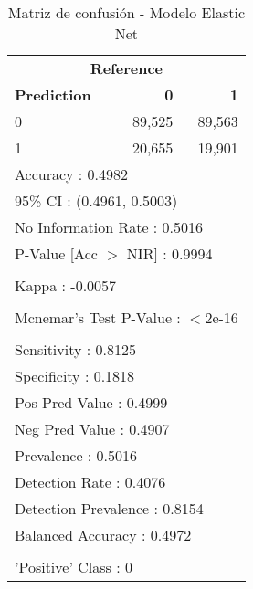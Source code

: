 \begin{table}[htbp]
\centering
\caption{Matriz de confusión - Modelo Elastic Net}
\label{tab:confusion-en}
\begin{tabular}{lrr}
\toprule
\multicolumn{3}{c}{\textbf{Reference}} \\
\textbf{Prediction} & \textbf{0} & \textbf{1} \\
\midrule
0 & 89,525 & 89,563 \\
1 & 20,655 & 19,901 \\
\midrule
\multicolumn{3}{l}{Accuracy : 0.4982} \\
\multicolumn{3}{l}{95\% CI : (0.4961, 0.5003)} \\
\multicolumn{3}{l}{No Information Rate : 0.5016} \\
\multicolumn{3}{l}{P-Value [Acc $>$ NIR] : 0.9994} \\
\\
\multicolumn{3}{l}{Kappa : -0.0057} \\
\\
\multicolumn{3}{l}{Mcnemar's Test P-Value : $<$2e-16} \\
\\
\multicolumn{3}{l}{Sensitivity : 0.8125} \\
\multicolumn{3}{l}{Specificity : 0.1818} \\
\multicolumn{3}{l}{Pos Pred Value : 0.4999} \\
\multicolumn{3}{l}{Neg Pred Value : 0.4907} \\
\multicolumn{3}{l}{Prevalence : 0.5016} \\
\multicolumn{3}{l}{Detection Rate : 0.4076} \\
\multicolumn{3}{l}{Detection Prevalence : 0.8154} \\
\multicolumn{3}{l}{Balanced Accuracy : 0.4972} \\
\\
\multicolumn{3}{l}{'Positive' Class : 0} \\
\bottomrule
\end{tabular}
\end{table}
